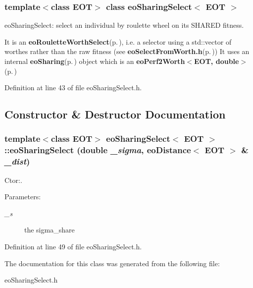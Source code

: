 \subsubsection*{template$<$class EOT$>$ class eo\-Sharing\-Select$<$ EOT $>$}

eo\-Sharing\-Select: select an individual by roulette wheel on its SHARED fitness. 

It is an {\bf eo\-Roulette\-Worth\-Select}{\rm (p.\,\pageref{classeo_roulette_worth_select})}, i.e. a selector using a std::vector of worthes rather than the raw fitness (see {\bf eo\-Select\-From\-Worth.h}{\rm (p.\,\pageref{eo_select_from_worth_8h})}) It uses an internal {\bf eo\-Sharing}{\rm (p.\,\pageref{classeo_sharing})} object which is an {\bf eo\-Perf2Worth$<$EOT, double$>$}{\rm (p.\,\pageref{classeo_perf2_worth})} 



Definition at line 43 of file eo\-Sharing\-Select.h.

\subsection{Constructor \& Destructor Documentation}
\subsubsection{\setlength{\rightskip}{0pt plus 5cm}template$<$class EOT$>$ {\bf eo\-Sharing\-Select}$<$ {\bf EOT} $>$::{\bf eo\-Sharing\-Select} (double {\em \_\-sigma}, {\bf eo\-Distance}$<$ {\bf EOT} $>$ \& {\em \_\-dist})\hspace{0.3cm}{\tt  [inline]}}\label{classeo_sharing_select_a0}


Ctor:. 

\begin{Desc}
\item[Parameters:]
\begin{description}
\item[{\em \_\-s}]the sigma\_\-share \end{description}
\end{Desc}


Definition at line 49 of file eo\-Sharing\-Select.h.

The documentation for this class was generated from the following file:\begin{CompactItemize}
\item 
eo\-Sharing\-Select.h\end{CompactItemize}
